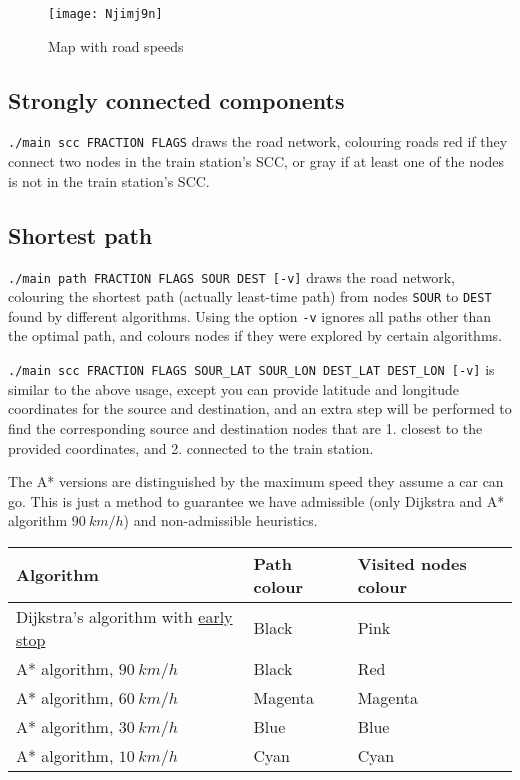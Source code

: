 \begin{figure}[H]
    \centering
    \texttt{[image: Njimj9n]}
    \caption{Map with road speeds}
\end{figure}

\subsection{Strongly connected components}
\texttt{./main scc FRACTION FLAGS} draws the road network, colouring roads red if they connect two nodes in the train station's \acrshort{SCC}, or gray if at least one of the nodes is not in the train station's \acrshort{SCC}.
\subsection{Shortest path}
\texttt{./main path FRACTION FLAGS SOUR DEST [-v]} draws the road network, colouring the shortest path (actually least-time path) from nodes \texttt{SOUR} to \texttt{DEST} found by different algorithms. Using the option \texttt{-v} ignores all paths other than the optimal path, and colours nodes if they were explored by certain algorithms.\par

\texttt{./main scc FRACTION FLAGS SOUR\_LAT SOUR\_LON DEST\_LAT DEST\_LON [-v]} is similar to the above usage, except you can provide latitude and longitude coordinates for the source and destination, and an extra step will be performed to find the corresponding source and destination nodes that are 1. closest to the provided coordinates, and 2. connected to the train station.\par

The A* versions are distinguished by the maximum speed they assume a car can go. This is just a method to guarantee we have admissible (only Dijkstra and A* algorithm $\SI{90}{km/h}$) and non-admissible heuristics.
\begin{center}
    \begin{tabular}{l | l | l}
        \textbf{Algorithm}            & \textbf{Path colour} & \textbf{Visited nodes colour} \\ \hline
        Dijkstra's algorithm with \hyperref[alg:dijkstra-early-stop]{early stop} & Black                & Pink                          \\
        A* algorithm, $\SI{90}{km/h}$ & Black                & Red                           \\
        A* algorithm, $\SI{60}{km/h}$ & Magenta              & Magenta                       \\
        A* algorithm, $\SI{30}{km/h}$ & Blue                 & Blue                          \\
        A* algorithm, $\SI{10}{km/h}$ & Cyan                 & Cyan                          
    \end{tabular}
\end{center}

